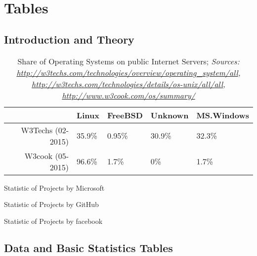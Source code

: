 \section{Tables}

\subsection{Introduction and Theory}

\begin{table}[ht]
\centering
\begin{tabular}{rllll}
  \hline
 & Linux & FreeBSD & Unknown & MS.Windows \\
  \hline
W3Techs (02-2015) & 35.9\% & 0.95\% & 30.9\% & 32.3\% \\
  W3cook (05-2015) & 96.6\% & 1.7\% & 0\% & 1.7\% \\
   \hline
\end{tabular}
\caption{Share of Operating Systems on public Internet Servers; \textit{Sources: \url{http://w3techs.com/technologies/overview/operating_system/all}, \url{http://w3techs.com/technologies/details/os-unix/all/all}, \url{http://www.w3cook.com/os/summary/}}}
\label{tbl:publicserver2015}
\end{table}

\begin{table}[!h]
\centering

\caption{Statistic of Projects by Microsoft}
\label{tbl:summary_microsoft}
\end{table}

\begin{table}[!h]
\centering

\caption{Statistic of Projects by GitHub}
\label{tbl:summary_github}
\end{table}

\begin{table}[!h]
\centering

\caption{Statistic of Projects by facebook}
\label{tbl:summary_facebook}
\end{table}

\clearpage
\subsection{Data and Basic Statistics Tables}

	

	\begin{landscape}
		\footnotesize{
			
		}
	\end{landscape}

